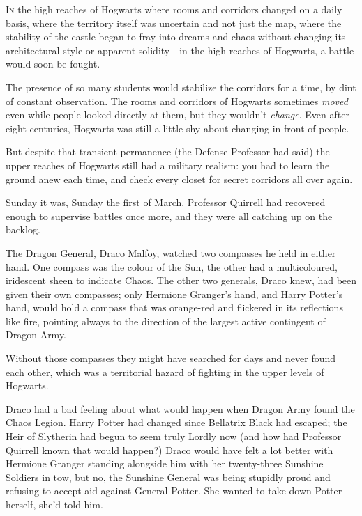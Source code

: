 
\lettrine{I}{n} the high
reaches of Hogwarts where rooms and corridors changed on a daily basis, where
the territory itself was uncertain and not just the map, where the stability of
the castle began to fray into dreams and chaos without changing its
architectural style or apparent solidity---in the high reaches of Hogwarts, a
battle would soon be fought.

The presence of so many students would stabilize the corridors for a time, by
dint of constant observation. The rooms and corridors of Hogwarts sometimes
\emph{moved} even while people looked directly at them, but they wouldn't
\emph{change}. Even after eight centuries, Hogwarts was still a little shy
about changing in front of people.

But despite that transient permanence (the Defense Professor had said) the
upper reaches of Hogwarts still had a military realism: you had to learn the
ground anew each time, and check every closet for secret corridors all over
again.

Sunday it was, Sunday the first of March. Professor Quirrell had recovered
enough to supervise battles once more, and they were all catching up on the
backlog.

The Dragon General, Draco Malfoy, watched two compasses he held in either hand.
One compass was the colour of the Sun, the other had a multicoloured, iridescent
sheen to indicate Chaos. The other two generals, Draco knew, had been given
their own compasses; only Hermione Granger's hand, and Harry Potter's hand,
would hold a compass that was orange-red and flickered in its reflections like
fire, pointing always to the direction of the largest active contingent of
Dragon Army.

Without those compasses they might have searched for days and never found each
other, which was a territorial hazard of fighting in the upper levels of
Hogwarts.

Draco had a bad feeling about what would happen when Dragon Army found the
Chaos Legion. Harry Potter had changed since Bellatrix Black had escaped; the
Heir of Slytherin had begun to seem truly Lordly now (and how had Professor
Quirrell known that would happen?) Draco would have felt a lot better with
Hermione Granger standing alongside him with her twenty-three Sunshine Soldiers
in tow, but no, the Sunshine General was being stupidly proud and refusing to
accept aid against General Potter. She wanted to take down Potter herself,
she'd told him.

